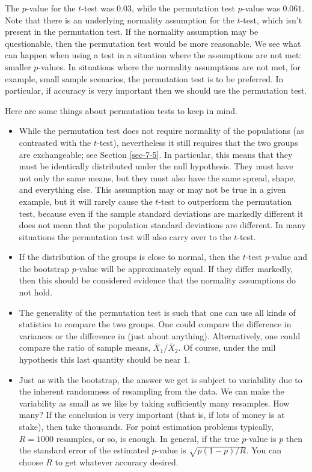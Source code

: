 \documentclass[captions=tableheading]{scrbook}
\begin{document}
\begin{example}
The \(p\)-value for the \(t\)-test was \(  0.03 \), while the permutation test \(p\)-value was \(  0.061 \). Note that there is an underlying normality assumption for the \(t\)-test, which isn't present in the permutation test. If the normality assumption may be questionable, then the permutation test would be more reasonable. We see what can happen when using a test in a situation where the assumptions are not met: smaller \(p\)-values. In situations where the normality assumptions are not met, for example, small sample scenarios, the permutation test is to be preferred. In particular, if accuracy is very important then we should use the permutation test. 

\begin{rem}
Here are some things about permutation tests to keep in mind.
\begin{itemize}
\item While the permutation test does not require normality of the populations (as contrasted with the \(t\)-test), nevertheless it still requires that the two groups are exchangeable; see Section \ref{sec-7-5}. In particular, this means that they must be identically distributed under the null hypothesis. They must have not only the same means, but they must also have the same spread, shape, and everything else. This assumption may or may not be true in a given example, but it will rarely cause the \(t\)-test to outperform the permutation test, because even if the sample standard deviations are markedly different it does not mean that the population standard deviations are different. In many situations the permutation test will also carry over to the \(t\)-test.
\item If the distribution of the groups is close to normal, then the \(t\)-test \(p\)-value and the bootstrap \(p\)-value will be approximately equal. If they differ markedly, then this should be considered evidence that the normality assumptions do not hold.
\item The generality of the permutation test is such that one can use all kinds of statistics to compare the two groups. One could compare the difference in variances or the difference in (just about anything). Alternatively, one could compare the ratio of sample means, \(\overline{X}_{1}/\overline{X}_{2}\). Of course, under the null hypothesis this last quantity should be near 1.
\item Just as with the bootstrap, the answer we get is subject to variability due to the inherent randomness of resampling from the data. We can make the variability as small as we like by taking sufficiently many resamples. How many? If the conclusion is very important (that is, if lots of money is at stake), then take thousands. For point estimation problems typically, \(R=1000\) resamples, or so, is enough. In general, if the true \(p\)-value is \(p\) then the standard error of the estimated \(p\)-value is \(\sqrt{p(1-p)/R}\). You can choose \(R\) to get whatever accuracy desired.
\end{itemize}


\end{rem}
\end{example}
\end{document}
